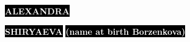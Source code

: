 \documentclass[11pt]{developercv} %
\title{\Title}
\begin{document}

\begin{minipage}[t]{0.39\textwidth} %
  \vspace{-\baselineskip} %
  \colorbox{black}{{\HUGE\textcolor{white}{\textbf{\MakeUppercase{Alexandra}}}}} %

  \colorbox{black}{{\HUGE\textcolor{white}{\textbf{\MakeUppercase{Shiryaeva}}}}} %
  \colorbox{black}{{\large\textcolor{white}{\textbf{(name at birth Borzenkova)}}}} %

  \raggedright{}
\end{minipage}
\begin{minipage}[t]{0.45\textwidth} %
  \vspace{-\baselineskip} %
  \\
  \\
  \\
\end{minipage}
\end{document}
